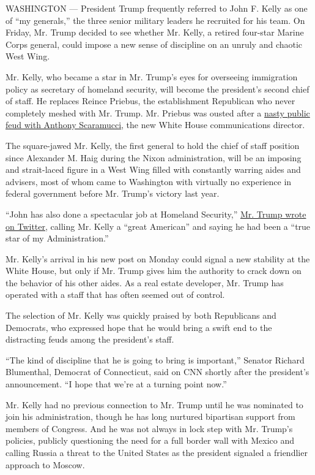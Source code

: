 WASHINGTON --- President Trump frequently referred to John F. Kelly as
one of ``my generals,'' the three senior military leaders he recruited
for his team. On Friday, Mr. Trump decided to see whether Mr. Kelly, a
retired four-star Marine Corps general, could impose a new sense of
discipline on an unruly and chaotic West Wing.

Mr. Kelly, who became a star in Mr. Trump's eyes for overseeing
immigration policy as secretary of homeland security, will become the
president's second chief of staff. He replaces Reince Priebus, the
establishment Republican who never completely meshed with Mr. Trump. Mr.
Priebus was ousted after a
\href{https://www.nytimes3xbfgragh.onion/2017/07/27/us/politics/scaramucci\%2Dpriebus\%2Dleaks.html?_r=0}{nasty
public feud with Anthony Scaramucci}, the new White House communications
director.

The square-jawed Mr. Kelly, the first general to hold the chief of staff
position since Alexander M. Haig during the Nixon administration, will
be an imposing and strait-laced figure in a West Wing filled with
constantly warring aides and advisers, most of whom came to Washington
with virtually no experience in federal government before Mr. Trump's
victory last year.

``John has also done a spectacular job at Homeland Security,''
\href{https://twitter.com/realDonaldTrump/status/891039237319143424}{Mr.
Trump wrote on Twitter}, calling Mr. Kelly a ``great American'' and
saying he had been a ``true star of my Administration.''

Mr. Kelly's arrival in his new post on Monday could signal a new
stability at the White House, but only if Mr. Trump gives him the
authority to crack down on the behavior of his other aides. As a real
estate developer, Mr. Trump has operated with a staff that has often
seemed out of control.

The selection of Mr. Kelly was quickly praised by both Republicans and
Democrats, who expressed hope that he would bring a swift end to the
distracting feuds among the president's staff.

``The kind of discipline that he is going to bring is important,''
Senator Richard Blumenthal, Democrat of Connecticut, said on CNN shortly
after the president's announcement. ``I hope that we're at a turning
point now.''

Mr. Kelly had no previous connection to Mr. Trump until he was nominated
to join his administration, though he has long nurtured bipartisan
support from members of Congress. And he was not always in lock step
with Mr. Trump's policies, publicly questioning the need for a full
border wall with Mexico and calling Russia a threat to the United States
as the president signaled a friendlier approach to Moscow.

